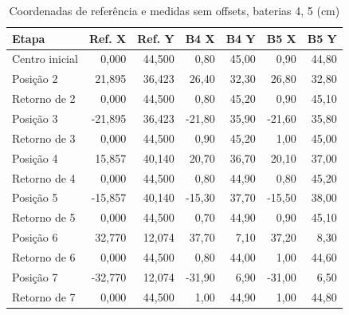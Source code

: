 \begin{table}[H]\centering
\caption{Coordenadas de referência e medidas sem offsets, baterias 4, 5 (cm)}
\label{tab:coordenadas-sem-45}
\scriptsize\setlength{\tabcolsep}{2.4pt}
\begin{tabular}{lrrrrrr}\toprule
Etapa & Ref. X & Ref. Y & B4 X & B4 Y & B5 X & B5 Y \\
\midrule
Centro inicial & 0,000 & 44,500 & 0,80 & 45,00 & 0,90 & 44,80\\
Posição 2 & 21,895 & 36,423 & 26,40 & 32,30 & 26,80 & 32,80\\
Retorno de 2 & 0,000 & 44,500 & 0,80 & 45,20 & 0,90 & 45,10\\
Posição 3 & -21,895 & 36,423 & -21,80 & 35,90 & -21,60 & 35,80\\
Retorno de 3 & 0,000 & 44,500 & 0,90 & 45,20 & 1,00 & 45,00\\
Posição 4 & 15,857 & 40,140 & 20,70 & 36,70 & 20,10 & 37,00\\
Retorno de 4 & 0,000 & 44,500 & 0,80 & 44,90 & 0,80 & 45,20\\
Posição 5 & -15,857 & 40,140 & -15,30 & 37,70 & -15,50 & 38,00\\
Retorno de 5 & 0,000 & 44,500 & 0,70 & 44,90 & 0,90 & 45,10\\
Posição 6 & 32,770 & 12,074 & 37,70 & 7,10 & 37,20 & 8,30\\
Retorno de 6 & 0,000 & 44,500 & 0,80 & 44,00 & 1,00 & 44,60\\
Posição 7 & -32,770 & 12,074 & -31,90 & 6,90 & -31,00 & 6,50\\
Retorno de 7 & 0,000 & 44,500 & 1,00 & 44,90 & 1,00 & 44,80\\
\bottomrule\end{tabular}
\par{}
\end{table}
